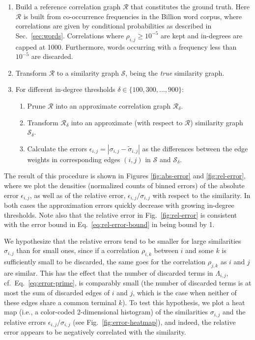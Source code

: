 \documentclass{kais}
\begin{document}
\begin{enumerate}
\item Build a reference correlation graph $\mathcal{R}$ that constitutes the ground truth. 
Here $\mathcal{R}$ is built from co-occurrence frequencies in the Billion word corpus, 
where correlations are given by conditional probabilities as described in Sec.\ \ref{sec:words}.
Correlations where $\rho_{i,j} \geq 10^{-5}$ are kept and in-degrees are capped at 1000.
Furthermore, words occurring with a frequency less than $10^{-5}$ are discarded.
\item Transform $\mathcal{R}$ to a similarity graph $\mathcal{S}$, being the
\emph{true} similarity graph.
\item For different in-degree thresholds $\delta \in \{100, 300, ..., 900\}$:
\begin{enumerate}
\item Prune $\mathcal{R}$ into an approximate correlation graph $\mathcal{R}_{\delta}$.
\item Transform $\mathcal{R}_{\delta}$ into an approximate (with respect to $\mathcal{R}$) similarity 
graph $\mathcal{S}_{\delta}$. 
\item Calculate the errors $\epsilon_{i,j} = |\sigma_{i,j} - \tilde{\sigma}_{i,j}|$ as the differences between
the edge weights in corresponding edges $(i,j)$ in $\mathcal{S}$ and $\mathcal{S}_{\delta}$.
\end{enumerate}
\end{enumerate}

The result of this procedure is shown in Figures \ref{fig:abs-error} and \ref{fig:rel-error}, where we
plot the densities (normalized counts of binned errors) of the absolute error $\epsilon_{i,j}$, as well as of the relative error, 
$\epsilon_{i,j}/\sigma_{i,j}$ with respect to the similarity. In both cases the approximation
errors quickly decrease with growing in-degree thresholds. Note also that the relative error in 
Fig.\ \ref{fig:rel-error} is consistent with the error bound in Eq.\ \ref{eq:rel-error-bound} in being bound by 1.

We hypothesize that the relative errors tend to be smaller for large similarities $\sigma_{i,j}$ than for
 small ones, since if a correlation $\rho_{i,k}$ between $i$ and some $k$ is sufficiently small to be discarded,
the same goes for the correlation $\rho_{j,k}$  as $i$ and $j$ are similar. This has the effect that the number of
discarded terms in  $\Lambda_{i,j}$, cf.~Eq.~\ref{eq:error-prime}, is comparably small (the number 
of discarded terms is at most the sum of discarded edges of $i$ and $j$, which is the case when neither of these
edges share a common terminal $k$). To test this hypothesis, we plot a heat map (i.e., a color-coded 2-dimensional 
histogram) of the similarities $\sigma_{i,j}$ and the relative errors $\epsilon_{i,j}/\sigma_{i,j}$ (see Fig.\ \ref{fig:error-heatmap}), 
and indeed, the relative error appears to be negatively correlated with the similarity.
\end{document}
